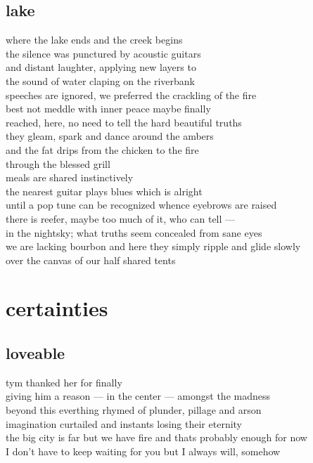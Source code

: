 \documentclass{article}
\begin{document}
\subsection{lake}

where the lake ends and the creek begins\\
the silence was punctured by acoustic guitars\\
and distant laughter, applying new layers to\\
the sound of water claping on the riverbank\\
speeches are ignored, we preferred the crackling of the fire\\

best not meddle with inner peace maybe finally\\
reached, here, no need to tell the hard beautiful truths\\
they gleam, spark and dance around the ambers\\
and the fat drips from the chicken to the fire\\
through the blessed grill\\

meals are shared instinctively\\
the nearest guitar plays blues which is alright\\
until a pop tune can be recognized whence eyebrows are raised\\
there is reefer, maybe too much of it, who can tell --- \\
in the nightsky; what truths seem concealed from sane eyes\\
we are lacking bourbon and
here they simply ripple and glide slowly\\
over the canvas of our half shared tents\\

\clearpage

\section{certainties}
\subsection{loveable}

tym thanked her for finally\\
giving him a reason --- in the center --- amongst the madness\\
beyond this everthing rhymed of plunder, pillage and arson\\
imagination curtailed and instants losing their eternity\\
the big city is far but we have fire and thats probably enough for now\\
I don't have to keep waiting for you but I always will, somehow\\
\end{document}
